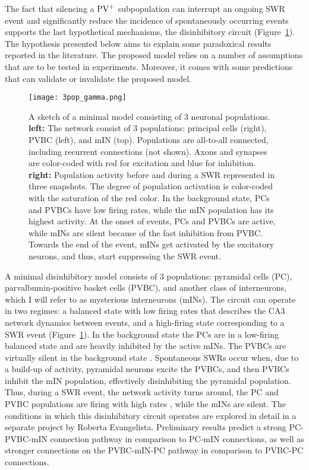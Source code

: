     The fact that silencing a $\rm PV^+$ subpopulation can interrupt an ongoing
    SWR event and significantly reduce the incidence of spontaneously occurring
    events \citep{Schlingloff2014} supports the last hypothetical mechanisms,
    the disinhibitory circuit (Figure~\ref{fig:3pop}). The hypothesis presented
    below aims to explain some paradoxical results reported in the literature.
    The proposed model relies on a number of assumptions that are to be tested
    in experiments. Moreover, it comes with some predictions that can validate
    or invalidate the proposed model.

    \begin{figure}
      \center
      \texttt{[image: 3pop\_gamma.png]}
      \caption{
        A sketch of a minimal model consisting of 3 neuronal populations.
        \textbf{left:} The network consist of 3 populations: principal cells
        (right), PVBC (left), and mIN (top). Populations are all-to-all
        connected, including recurrent connections (not shown). Axons and
        synapses are color-coded with red for excitation and blue for
        inhibition.
        \textbf{right:} Population activity before and during a SWR represented
        in three snapshots. The degree of population activation is color-coded
        with the saturation of the red color. In the background state, PCs and
        PVBCs have low firing rates, while the mIN population has its highest
        activity. At the onset of events, PCs and PVBCs are active, while mINs
        are silent because of the fast inhibition from PVBC. Towards the end of
        the event, mINs get activated by the excitatory neurons, and thus,
        start suppressing the SWR event.
             }
      \label{fig:3pop}
    \end{figure}
    
    A minimal disinhibitory model consists of 3 populations: pyramidal cells
    (PC), parvalbumin-positive basket cells (PVBC), and another class of
    interneurons, which I will refer to as mysterious interneurons (mINs). The
    circuit can operate in two regimes: a balanced state with low firing rates
    that describes the CA3 network dynamics between events, and a high-firing
    state corresponding to a SWR event (Figure~\ref{fig:3pop}). In the
    background state the PCs are in a low-firing \citep{Csicsvari1999} balanced
    state and are heavily inhibited by the active mINs. The PVBCs are virtually
    silent in the background state \citep{Klausberger2003, Varga2012}.
    Spontaneous SWRs occur when, due to a build-up of activity, pyramidal
    neurons excite the PVBCs, and then PVBCs inhibit the mIN population,
    effectively disinhibiting the pyramidal population. Thus, during a SWR
    event, the network activity turns around, the PC and PVBC populations are
    firing with high rates \citep{Klausberger2003, Varga2012}, while the mINs
    are silent. The conditions in which this disinhibitory circuit operates are
    explored in detail in a separate project by Roberta Evangelista.
    Preliminary results predict a strong PC-PVBC-mIN connection pathway in
    comparison to PC-mIN connections, as well as stronger connections on the
    PVBC-mIN-PC pathway in comparison to PVBC-PC connections.
    
